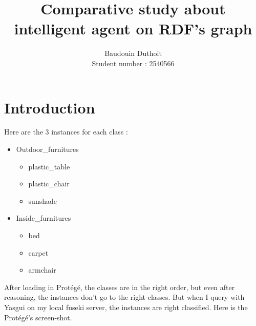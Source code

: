 \documentclass{article}
\newenvironment{itemh}[0]{\begin{itemize}[label=$\heartsuit$, font=\color{gray} \small]}{\end{itemize}}
\begin{document}
\title{Comparative study about intelligent agent on RDF's graph}
\author{Baudouin Duthoit\\
		Student number : 2540566}
\maketitle
\tableofcontents

\hypersetup{pdfsubject=Semantic Web}
\hypersetup{pdfauthor=Baudouin Duthoit}
\hypersetup{pdfkeywords=RDF Semantic Web Ant}

\newpage
\section{Introduction}
	Here are the 3 instances for each class :
		\begin{itemize}
			\item Outdoor\_furnitures
			\begin{itemh}
				\item plastic\_table
				\item plastic\_chair
				\item sunshade
			\end{itemh}
			\item Inside\_furnitures
			\begin{itemh}
				\item bed
				\item carpet
				\item armchair
			\end{itemh}
		\end{itemize}
	After loading in Prot\'eg\'e, the classes are in the right order, but even after reasoning, the instances don't go to the right classes.
	But when I query with Yasgui on my local fuseki server, the instances are right classified.
	Here is the Prot\'eg\'e's screen-shot.

% 	
\newpage
\end{document}
